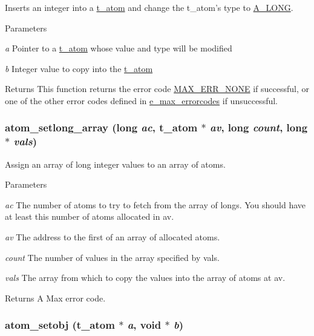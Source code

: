 Inserts an integer into a \hyperlink{structt__atom}{t\_\-atom} and change the t\_\-atom's type to \hyperlink{group__atom_gga8aa6700e9f00b132eb376db6e39ade47a002f28879581a6f66ea492b994b96f1e}{A\_\-LONG}. 
\begin{DoxyParams}{Parameters}
\item[{\em a}]Pointer to a \hyperlink{structt__atom}{t\_\-atom} whose value and type will be modified \item[{\em b}]Integer value to copy into the \hyperlink{structt__atom}{t\_\-atom}\end{DoxyParams}
\begin{DoxyReturn}{Returns}
This function returns the error code \hyperlink{group__misc_gga0764dd6c02b76cca7d053ae50555d69da6d22f77fef8b1e1b074cef5d29d935fd}{MAX\_\-ERR\_\-NONE} if successful, or one of the other error codes defined in \hyperlink{group__misc_ga0764dd6c02b76cca7d053ae50555d69d}{e\_\-max\_\-errorcodes} if unsuccessful. 
\end{DoxyReturn}
\hypertarget{group__atom_ga524207025bbc13a13e901ea5c175e0bf}{
\subsubsection[{atom\_\-setlong\_\-array}]{ atom\_\-setlong\_\-array (long {\em ac}, \/  {\bf t\_\-atom} $\ast$ {\em av}, \/  long {\em count}, \/  long $\ast$ {\em vals})}}
\label{group__atom_ga524207025bbc13a13e901ea5c175e0bf}


Assign an array of long integer values to an array of atoms. 
\begin{DoxyParams}{Parameters}
\item[{\em ac}]The number of atoms to try to fetch from the array of longs. You should have at least this number of atoms allocated in av. \item[{\em av}]The address to the first of an array of allocated atoms. \item[{\em count}]The number of values in the array specified by vals. \item[{\em vals}]The array from which to copy the values into the array of atoms at av. \end{DoxyParams}
\begin{DoxyReturn}{Returns}
A Max error code. 
\end{DoxyReturn}
\hypertarget{group__atom_ga0ad7d5c696047effee6b6bbf04a981c4}{
\subsubsection[{atom\_\-setobj}]{ atom\_\-setobj ({\bf t\_\-atom} $\ast$ {\em a}, \/  void $\ast$ {\em b})}}
\label{group__atom_ga0ad7d5c696047effee6b6bbf04a981c4}


